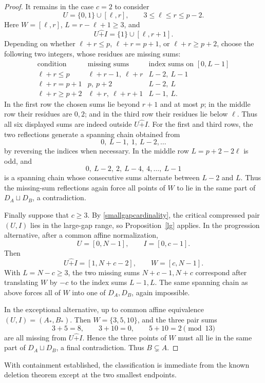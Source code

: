 \documentclass[12pt]{article}
\theoremstyle{remark}
\newcommand{\rs}{\mathbin{\widehat+}}
\begin{document}
\begin{proof}
It remains in the case $c=2$ to consider
\[
 U=\{0,1\}\cup[\ell,r],
 \qquad 3\le\ell\le r\le p-2.
\]
Here $W=[\ell,r]$, $L=r-\ell+1\ge3$, and
\[
 U\rs I=\{1\}\cup[\ell,r+1].
\]
Depending on whether $\ell+r\le p$, $\ell+r=p+1$, or
$\ell+r\ge p+2$, choose the following two integers, whose residues
are missing sums:
\[
\begin{array}{c|c|c}
\text{condition}&\text{missing sums}&\text{index sums on }[0,L-1]\\ \hline
\ell+r\le p&\ell+r-1,\ \ell+r&L-2,\ L-1\\
\ell+r=p+1&p,\ p+2&L-2,\ L\\
\ell+r\ge p+2&\ell+r,\ \ell+r+1&L-1,\ L.
\end{array}
\]
In the first row the chosen sums lie beyond $r+1$ and at most $p$; in
the middle row their residues are $0,2$; and in the third row their
residues lie below $\ell$.  Thus all six displayed sums are indeed
outside $U\rs I$.  For the first and third rows, the two reflections
generate a spanning chain obtained from
\[
 0,\ L-1,\ 1,\ L-2,\ldots
\]
by reversing the indices when necessary.  In the middle row
$L=p+2-2\ell$ is odd, and
\[
 0,\ L-2,\ 2,\ L-4,\ 4,\ldots,\ L-1
\]
is a spanning chain whose consecutive sums alternate between $L-2$ and
$L$.  Thus the missing-sum reflections again force all points of $W$ to
lie in the same part of $D_A\sqcup D_B$, a contradiction.

Finally suppose that $c\ge3$.  By \eqref{smallgapcardinality}, the
critical compressed pair $(U,I)$ lies in the large-gap range, so
Proposition~\ref{lg} applies.  In the progression alternative, after a
common affine normalization,
\[
 U=[0,N-1],\qquad I=[0,c-1].
\]
Then
\[
 U\rs I=[1,N+c-2],\qquad W=[c,N-1].
\]
With $L=N-c\ge3$, the two missing sums $N+c-1,N+c$ correspond after
translating $W$ by $-c$ to the index sums $L-1,L$.  The same spanning
chain as above forces all of $W$ into one of $D_A,D_B$, again impossible.

In the exceptional alternative, up to common affine equivalence
$(U,I)=(A_*,B_*)$.  Then $W=\{3,5,10\}$, and the three pair sums
\[
 3+5=8,\qquad 3+10=0,\qquad 5+10=2\pmod{13}
\]
are all missing from $U\rs I$.  Hence the three points of $W$ must all
lie in the same part of $D_A\sqcup D_B$, a final contradiction.
Thus $B\subsetneq A$.
\end{proof}

With containment established, the classification is immediate from the
known deletion theorem except at the two smallest endpoints.
\end{document}
